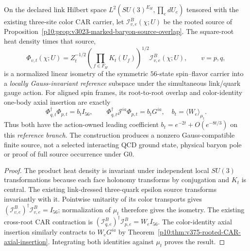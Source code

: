 \documentclass[12pt,a4paper]{article}
\begin{document}
\begin{corollary}
\label{p10:cor:v378-gauss-rooted-heat-axial}
On the declared link Hilbert space
$L^2(SU(3)^{E_H},\prod_e dU_e)$ tensored with the existing
three-site color CAR carrier, let $\mathcal I^B_{v,e}(\chi;U)$
be the rooted source of
Proposition~\ref{p10:prop:v3023-marked-baryon-source-overlap}.
The square-root heat density times that source,
\[
 \Phi_{v,t}(\chi;U)=Z_t^{-1/2}
       \left(\prod_{f\in F_H}K_t(U_f)\right)^{1/2}
       \mathcal I^B_{v,e}(\chi;U),\qquad v=p,q,
\]
is a normalized linear isometry of the symmetric $56$-state
spin--flavor carrier into a \emph{locally Gauss-invariant reference}
subspace under the simultaneous link/quark gauge action. For
aligned spin frames, its root-to-root overlap and color-identity
one-body axial insertion are exactly
\[
\boxed{
 \Phi_{q,t}^{\dagger}\Phi_{p,t}=b_t I_{56},\qquad
 \Phi_{q,t}^{\dagger}\mathcal J^{ia}\Phi_{p,t}
       =b_t G^{ia},\quad b_t=\langle W_e\rangle_{\mu_t}.}
\]
Thus both have the action-owned leading coefficient
$b_t=e^{-2t}+O(e^{-8t/3})$ on this \emph{reference branch}.
The construction produces a nonzero Gauss-compatible finite source,
not a selected interacting QCD ground state, physical baryon pole
or proof of full source occurrence under G0.
\end{corollary}
\begin{proof}
The product heat density is invariant under independent local
$SU(3)$ transformations because each face holonomy transforms by
conjugation and $K_t$ is central. The existing link-dressed
three-quark epsilon source transforms invariantly with it.
Pointwise unitarity of its color transports gives
$(\mathcal I^B_{v,e})^\dagger\mathcal I^B_{v,e}=I_{56}$;
normalization of $\mu_t$ therefore gives the isometry. The
existing cross-root CAR contraction is
$(\mathcal I^B_{q,e})^\dagger\mathcal I^B_{p,e}=W_eI_{56}$.
The color-identity axial insertion similarly contracts to
$W_eG^{ia}$ by
Theorem~\ref{p10:thm:v375-rooted-CAR-axial-insertion}.
Integrating both identities against $\mu_t$ proves the result.
\end{proof}
\end{document}
